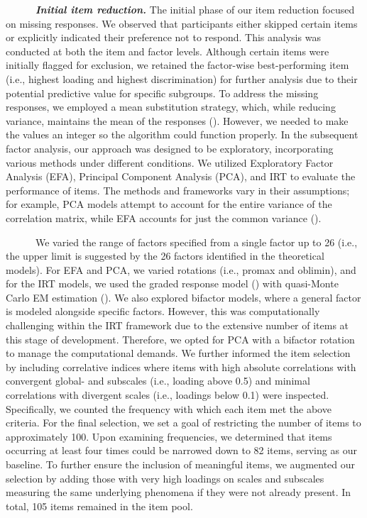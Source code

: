\documentclass[
  man,floatsintext]{apa7}
\begin{document}
~~~~~~\textbf{\emph{Initial item reduction.}} The initial phase of our item reduction focused on missing responses. We observed that participants either skipped certain items or explicitly indicated their preference not to respond. This analysis was conducted at both the item and factor levels. Although certain items were initially flagged for exclusion, we retained the factor-wise best-performing item (i.e., highest loading and highest discrimination) for further analysis due to their potential predictive value for specific subgroups. To address the missing responses, we employed a mean substitution strategy, which, while reducing variance, maintains the mean of the responses (). However, we needed to make the values an integer so the algorithm could function properly. In the subsequent factor analysis, our approach was designed to be exploratory, incorporating various methods under different conditions. We utilized Exploratory Factor Analysis (EFA), Principal Component Analysis (PCA), and IRT to evaluate the performance of items. The methods and frameworks vary in their assumptions; for example, PCA models attempt to account for the entire variance of the correlation matrix, while EFA accounts for just the common variance ().

~~~~~~We varied the range of factors specified from a single factor up to 26 (i.e., the upper limit is suggested by the 26 factors identified in the theoretical models). For EFA and PCA, we varied rotations (i.e., promax and oblimin), and for the IRT models, we used the graded response model () with quasi-Monte Carlo EM estimation (). We also explored bifactor models, where a general factor is modeled alongside specific factors. However, this was computationally challenging within the IRT framework due to the extensive number of items at this stage of development. Therefore, we opted for PCA with a bifactor rotation to manage the computational demands. We further informed the item selection by including correlative indices where items with high absolute correlations with convergent global- and subscales (i.e., loading above 0.5) and minimal correlations with divergent scales (i.e., loadings below 0.1) were inspected. Specifically, we counted the frequency with which each item met the above criteria. For the final selection, we set a goal of restricting the number of items to approximately 100. Upon examining frequencies, we determined that items occurring at least four times could be narrowed down to 82 items, serving as our baseline. To further ensure the inclusion of meaningful items, we augmented our selection by adding those with very high loadings on scales and subscales measuring the same underlying phenomena if they were not already present. In total, 105 items remained in the item pool.
\end{document}
